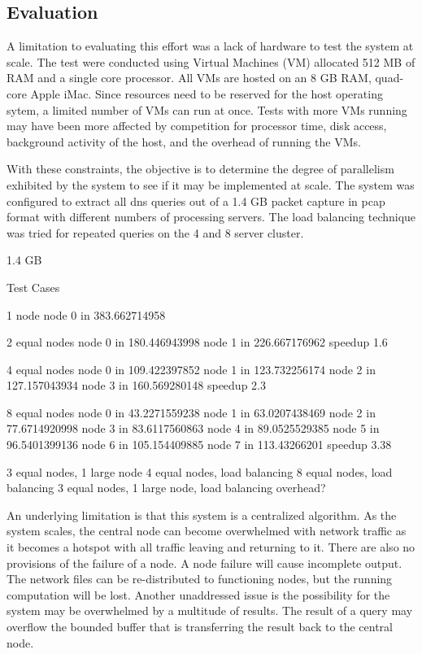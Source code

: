\documentclass{article}
\begin{document}
\begin{multicols}{2}
\section{Evaluation} 

A limitation to evaluating this effort was a lack of hardware to test the system at scale. The test were conducted using Virtual Machines (VM) allocated 512 MB of RAM and a single core processor.  All VMs are hosted on an 8 GB RAM, quad-core Apple iMac. Since resources need to be reserved for the host operating sytem, a limited number of VMs can run at once.  Tests with more VMs running may have been more affected by competition for processor time, disk access, background activity of the host, and the overhead of running the VMs.

With these constraints, the objective is to determine the degree of parallelism exhibited by the system to see if it may be implemented at scale. The system was configured to extract all dns queries out of a 1.4 GB packet capture in pcap format with different numbers of processing servers.  The load balancing technique was tried for repeated queries on the 4 and 8 server cluster. 

1.4 GB

Test Cases

1 node
node 0 in 383.662714958

2 equal nodes
node 0 in 180.446943998
node 1 in 226.667176962
speedup 1.6

4 equal nodes
node 0 in 109.422397852
node 1 in 123.732256174
node 2 in 127.157043934
node 3 in 160.569280148
speedup 2.3

8 equal nodes
node 0 in 43.2271559238
node 1 in 63.0207438469
node 2 in 77.6714920998
node 3 in 83.6117560863
node 4 in 89.0525529385
node 5 in 96.5401399136
node 6 in 105.154409885
node 7 in 113.43266201
speedup 3.38


3 equal nodes, 1 large node
4 equal nodes, load balancing
8 equal nodes, load balancing
3 equal nodes, 1 large node, load balancing
overhead?




An underlying limitation is that this system is a centralized algorithm. As the system scales, the central node can become overwhelmed with network traffic as it becomes a hotspot with all traffic leaving and returning to it. There are also no provisions of the failure of a node.  A node failure will cause incomplete output.  The network files can be re-distributed to functioning nodes, but the running computation will be lost.  Another unaddressed issue is the possibility for the system may be overwhelmed by a multitude of results. The result of a query may overflow the bounded buffer that is transferring the result back to the central node. 



\end{multicols}
\end{document}
